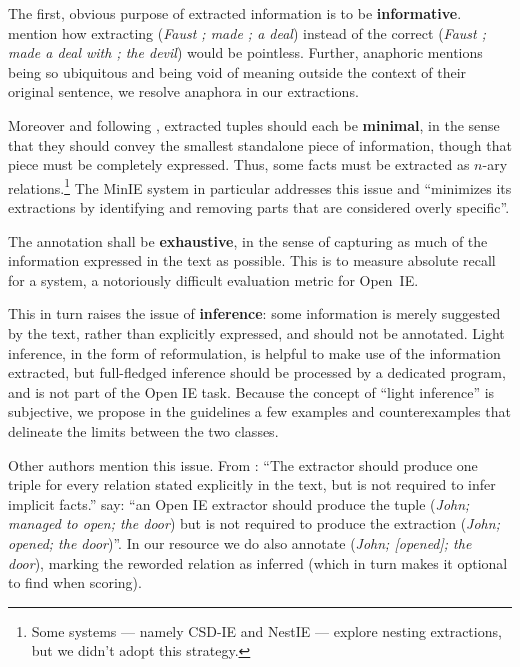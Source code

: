 \pdfoutput=1 \documentclass[11pt, a4paper]{article}
\begin{document}
The first, obvious purpose of extracted information is to be
\textbf{informative}. \citet{Fader:2011:IRO:2145432.2145596} mention how
extracting (\emph{Faust ; made ; a deal}) instead of the correct (\emph{Faust ; made
a deal with ; the devil}) would be pointless. Further, anaphoric mentions
being so ubiquitous and being void of meaning outside the context of their
original sentence, we resolve anaphora in our extractions.

Moreover and following \cite{Stanovsky2016EMNLP}, extracted tuples should
each be \textbf{minimal}, in the sense that they should convey the smallest
standalone piece of information, though that piece must be completely
expressed. Thus, some facts must be extracted as
$n$-ary relations.\footnote{Some systems --- namely CSD-IE
\cite{bast2013open} and NestIE \cite{D16-1006} --- explore nesting
extractions, but we didn't adopt this strategy.} The MinIE system in particular addresses this issue and ``minimizes its
extractions by identifying and removing parts that are considered overly
specific''.

The annotation shall be \textbf{exhaustive}, in the sense of capturing as much of
the information expressed in the text as possible. This is to measure
absolute recall for a system, a notoriously difficult evaluation metric for
Open~IE.

This in turn raises the issue of \textbf{inference}: some information is merely
suggested by the text, rather than explicitly expressed, and should not be
annotated. Light inference, in the form of reformulation, is helpful to
make use of the information extracted, but full-fledged inference should be
processed by a dedicated program, and is not part of the Open IE task. Because the concept of ``light inference'' is subjective, we propose in the guidelines a few examples and counterexamples that delineate the limits between the two classes. 

Other authors mention this issue. From \cite{Wu:2010:OIE:1858681.1858694} :
``The extractor should produce one triple for every relation stated
explicitly in the text, but is not required to infer implicit facts.''
\citet{Stanovsky2016EMNLP} say: ``an Open IE extractor should produce the tuple
(\emph{John; managed to open; the door}) but is not required to produce the
extraction (\emph{John; opened; the door})''. In our resource we do also
annotate (\emph{John; [opened]; the door}), marking the reworded relation as
inferred (which in turn makes it optional to find when scoring).
\end{document}
